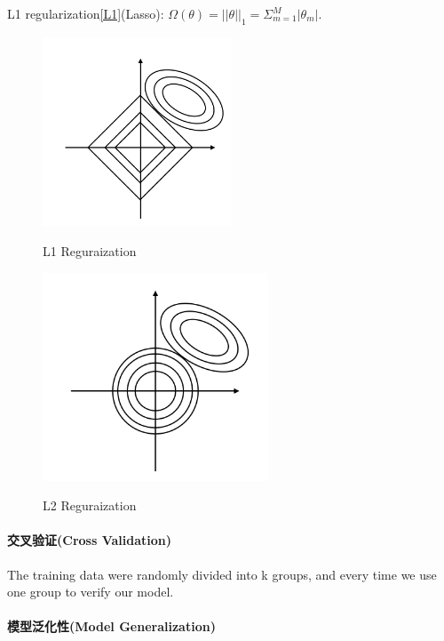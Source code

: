 L1 regularization\ref{L1}(Lasso): $\Omega(\theta) = ||\theta||_1 = \Sigma_{m=1}^M|\theta_m|.$

\begin{figure}[h]
  \begin{minipage}{0.48\linewidth}
    \centerline{\includegraphics[width = 0.5\textwidth]{ref/L1}}
    \label{L1}
    \caption{L1 Reguraization}
  \end{minipage}
\hfill
\begin{minipage}{0.48\linewidth}
  \centerline{\includegraphics[width = 0.6\textwidth]{ref/L2}}
    \label{L2}
    \caption{L2 Reguraization}
\end{minipage}
\end{figure}

\paragraph{交叉验证(Cross Validation)} The training data were randomly divided into k groups, and every time we use one group to verify our model.


\paragraph{模型泛化性(Model Generalization)} 

